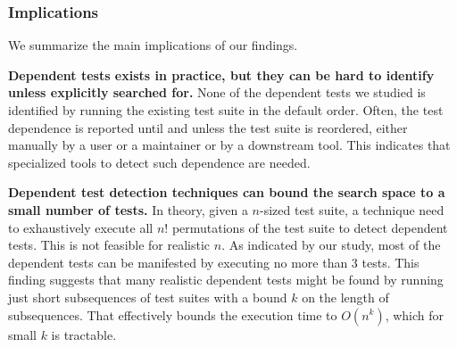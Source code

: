 





\subsubsection{Implications}

We summarize the main implications of our findings.

\noindent \textbf{{Dependent tests exists in practice, but
they can be hard to identify unless explicitly searched for.}}
None of the dependent tests we studied is identified by
running the existing test suite in the default order. Often,
the test dependence is reported until and unless the
test suite is reordered, either manually by a user or
a maintainer or by a downstream tool. This indicates that
specialized tools to detect such dependence are needed.

\vspace{1mm}
\noindent \textbf{Dependent test detection techniques
can bound the search space to a small number of tests.}
In theory, given a $n$-sized test suite, a technique need
to exhaustively execute all $n!$ permutations of the
test suite to detect dependent tests. This is
not feasible for realistic $n$. As indicated by our study,
most of the dependent tests can be manifested by executing
no more than 3 tests. This finding suggests that
many realistic dependent tests might be found by
running just short subsequences of test suites
with a bound $k$ on the length of subsequences. That
effectively bounds the execution time to $O(n^k)$,
which for small $k$ is tractable.

